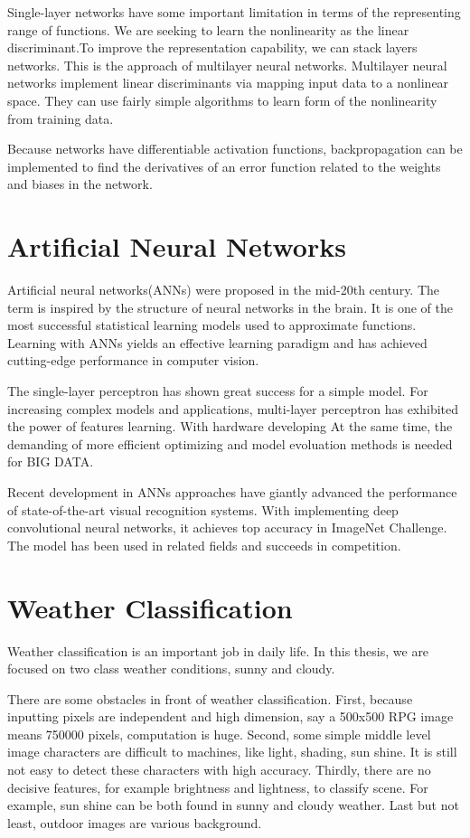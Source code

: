 Single-layer networks have some important limitation in terms of the representing range of functions. We are seeking to learn the nonlinearity as the linear discriminant.To improve the representation capability, we can stack layers networks. This is the approach of multilayer neural networks. Multilayer neural networks implement linear discriminants via mapping input data to a nonlinear space. They can use fairly simple algorithms to learn form of the nonlinearity from training data.

Because networks have differentiable activation functions, backpropagation can be implemented to find the derivatives of an error function related to the weights and biases in the network.

\section{Artificial Neural Networks}

Artificial neural networks(ANNs) were proposed in the mid-20th century. The term is inspired by the structure of neural networks in the brain. It is one of the most successful statistical learning models used to approximate functions. Learning with ANNs yields an effective learning paradigm and has achieved cutting-edge performance in computer vision. 

The single-layer perceptron  has shown great success for a simple model. For increasing complex models and applications, multi-layer perceptron has exhibited the power of features learning. With hardware developing At the same time, the demanding of more efficient optimizing and model evoluation methods is needed for BIG DATA. 

Recent development in ANNs approaches have giantly advanced the performance of state-of-the-art visual recognition systems. With implementing deep convolutional neural networks, it achieves top accuracy in ImageNet Challenge. The model has been used in related fields and succeeds in competition.

\section{Weather Classification}

Weather classification is an important job in daily life. In this thesis, we are focused on two class weather conditions, sunny and cloudy. 

There are some obstacles in front of weather classification. First, because inputting pixels are independent and high dimension, say a 500x500 RPG image means 750000 pixels, computation is huge. Second, some simple middle level image characters are difficult to machines, like light, shading, sun shine. It is still not easy to detect these characters with high accuracy.  Thirdly, there are no decisive features, for example brightness and lightness, to classify scene. For example, sun shine can be both found in sunny and cloudy weather. Last but not least, outdoor images are various background.


